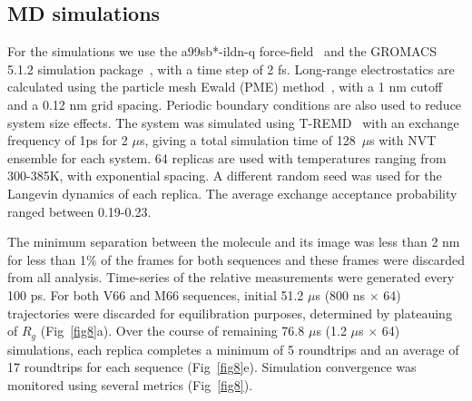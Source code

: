\documentclass[10pt,letterpaper]{article}
\begin{document}
\subsection*{MD simulations} For the simulations we use the a99sb*-ildn-q force-field~\cite{Lindorff-Larsen2010a, Hornak2006a} and the GROMACS 5.1.2 simulation package~\cite{Berendsen1995,Abraham2015a}, with a time step of 2 fs. Long-range electrostatics are calculated using the particle mesh Ewald (PME) method~\cite{Essmann1995}, with a 1 nm cutoff and a 0.12 nm grid spacing. Periodic boundary conditions are also used to reduce system size effects. The system was simulated using T-REMD~\cite{Sugita1999a} with an exchange frequency of 1ps for 2 $\mu$s, giving a total simulation time of 128~$\mu$s with NVT ensemble for each system. 64 replicas are used with temperatures ranging from 300-385K, with exponential spacing. A different random seed was used for the Langevin dynamics of each replica. The average exchange acceptance probability ranged between 0.19-0.23. 

The minimum separation between the molecule and its image was less than 2 nm for less than 1\% of the frames for both sequences and these frames were discarded from all analysis. Time-series of the relative measurements were generated every 100 ps. For both V66 and M66 sequences, initial 51.2 $\mu$s (800 ns $\times$ 64) trajectories were discarded for equilibration purposes, determined by plateauing of $R_g$ (Fig~\ref{fig8}a). Over the course of remaining 76.8 $\mu$s (1.2 $\mu$s $\times$ 64) simulations, each replica completes a minimum of 5 roundtrips and an average of 17 roundtrips for each sequence (Fig~\ref{fig8}e). Simulation convergence was monitored using several metrics (Fig~\ref{fig8}). 
\end{document}

